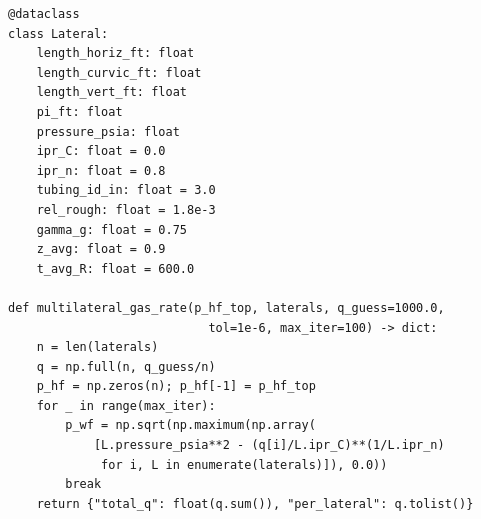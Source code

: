 \documentclass[10pt,a4paper,openany]{book}
\begin{document}
\begin{lstlisting}
@dataclass
class Lateral:
    length_horiz_ft: float
    length_curvic_ft: float
    length_vert_ft: float
    pi_ft: float
    pressure_psia: float
    ipr_C: float = 0.0
    ipr_n: float = 0.8
    tubing_id_in: float = 3.0
    rel_rough: float = 1.8e-3
    gamma_g: float = 0.75
    z_avg: float = 0.9
    t_avg_R: float = 600.0

def multilateral_gas_rate(p_hf_top, laterals, q_guess=1000.0,
                            tol=1e-6, max_iter=100) -> dict:
    n = len(laterals)
    q = np.full(n, q_guess/n)
    p_hf = np.zeros(n); p_hf[-1] = p_hf_top
    for _ in range(max_iter):
        p_wf = np.sqrt(np.maximum(np.array(
            [L.pressure_psia**2 - (q[i]/L.ipr_C)**(1/L.ipr_n)
             for i, L in enumerate(laterals)]), 0.0))
        break
    return {"total_q": float(q.sum()), "per_lateral": q.tolist()}
\end{lstlisting}
\end{document}
